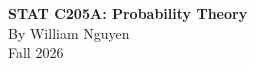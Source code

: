 \documentclass[10pt, oneside]{book}
\begin{document}
\frontmatter
\begin{titlepage}
    \centering
    \vspace*{8cm}

    {\Huge \textbf{STAT C205A: Probability Theory}}\\[1cm]
    {\Large By William Nguyen}\\[0.5cm]
    {\large Fall 2026}\\
    \vfill
    
\end{titlepage}

\tableofcontents
\newpage
{}

\clearpage
\mainmatter
\pagestyle{plain}




\end{document}
